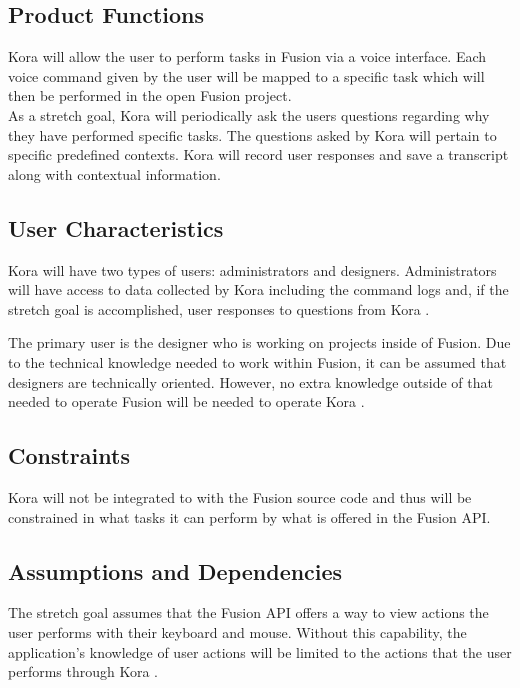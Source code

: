 \documentclass[onecolumn, draftclsnofoot,10pt, compsoc]{IEEEtran}
\def \botname{Kora }
\begin{document}
    \subsection{Product Functions}
        \botname will allow the user to perform tasks in Fusion via a voice interface. 
        Each voice command given by the user will be mapped to a specific task which will then be performed in the open Fusion project. \\
       
        As a stretch goal, \botname will periodically ask the users questions regarding why they have performed specific tasks.
        The questions asked by \botname will pertain to specific predefined contexts.
		\botname will record user responses and save a transcript along with contextual information.
        
    \subsection{User Characteristics}
		\botname will have two types of users: administrators and designers. 
		Administrators will have access to data collected by \botname including the command logs and, if the stretch goal is accomplished, user responses to questions from \botname. 
		
		The primary user is the designer who is working on projects inside of Fusion. 
        Due to the technical knowledge needed to work within Fusion, it can be assumed that designers are technically oriented.
        However, no extra knowledge outside of that needed to operate Fusion will be needed to operate \botname.
        
    \subsection{Constraints}
        \botname will not be integrated to with the Fusion source code and thus will be constrained in what tasks it can perform by what is offered in the Fusion API. 

    \subsection{Assumptions and Dependencies}
        The stretch goal assumes that the Fusion API offers a way to view actions the user performs with their keyboard and mouse.
        Without this capability, the application's knowledge of user actions will be limited to the actions that the user performs through \botname.
\end{document}
